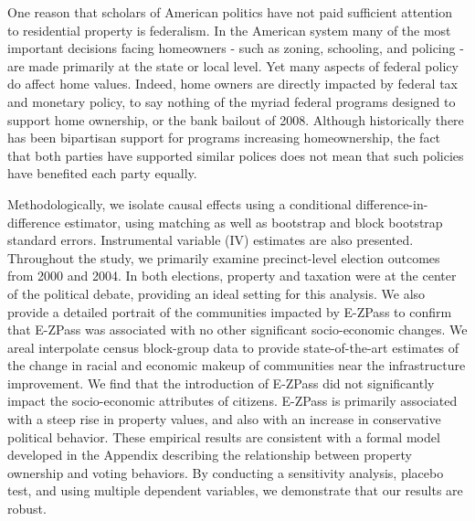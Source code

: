 One reason that scholars of American politics have not paid sufficient attention to residential property is federalism. In the American system many of the most important decisions facing homeowners - such as zoning, schooling, and policing - are made primarily at the state or local level. Yet many aspects of federal policy do affect home values. Indeed, home owners are directly impacted by federal tax and monetary policy, to say nothing of the myriad federal programs designed to support home ownership, or the bank bailout of 2008. Although historically there has been bipartisan support for programs increasing homeownership, the fact that both parties have supported similar polices does not mean that such policies have benefited each party equally.

Methodologically, we isolate causal effects using a conditional difference-in-difference estimator, using matching as well as bootstrap and block bootstrap standard errors. Instrumental variable (IV) estimates are also presented. Throughout the study, we primarily examine precinct-level election outcomes from 2000 and 2004. In both elections, property and taxation were at the center of the political debate, providing an ideal setting for this analysis. We also provide a detailed portrait of the communities impacted by E-ZPass to confirm that E-ZPass was associated with no other significant socio-economic changes. We areal interpolate census block-group data to provide state-of-the-art estimates of the change in racial and economic makeup of communities near the infrastructure improvement. We find that the introduction of E-ZPass did not significantly impact the socio-economic attributes of citizens. E-ZPass is primarily associated with a steep rise in property values, and also with an increase in conservative political behavior. These empirical results are consistent with a formal model developed in the Appendix describing the relationship between property ownership and voting behaviors. By conducting a sensitivity analysis, placebo test, and using multiple dependent variables, we demonstrate that our results are robust.